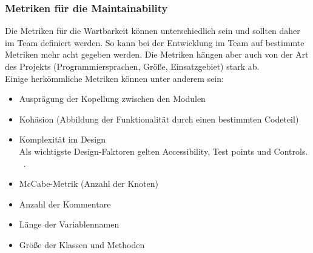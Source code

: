 \subsubsection{Metriken für die Maintainability}
Die Metriken für die Wartbarkeit können unterschiedlich sein und sollten daher im Team definiert werden. So kann bei der Entwicklung im Team auf bestimmte Metriken mehr acht gegeben werden. Die Metriken hängen aber auch von der Art des Projekts (Programmiersprachen, Größe, Einsatzgebiet) stark ab. \\
Einige herkömmliche Metriken können unter anderem sein:

\begin{itemize} 
\item Ausprägung der Kopellung zwischen den Modulen 
\item Kohäsion (Abbildung der Funktionalität durch einen bestimmten Codeteil)
\item Komplexität im Design \\
Als wichtigste Design-Faktoren gelten Accessibility, Test points und Controls. ~\parencite{dhillonMaintainability}.
\item McCabe-Metrik (Anzahl der Knoten)
\item Anzahl der Kommentare
\item Länge der Variablennamen
\item Größe der Klassen und Methoden
\end{itemize}
\chapterend